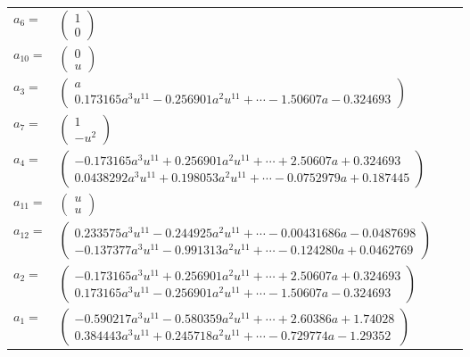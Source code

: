 \documentclass[1p]{elsarticle_modified}
\theoremstyle{definition}
\begin{document}
\begin{tabular}{m{7pt} m{180pt} m{7pt} m{180pt} }
\flushright $a_{6}=$&$\begin{pmatrix}1\\0\end{pmatrix}$ \\
\flushright $a_{10}=$&$\begin{pmatrix}0\\u\end{pmatrix}$ \\
\flushright $a_{3}=$&$\begin{pmatrix}a\\0.173165 a^{3} u^{11}-0.256901 a^{2} u^{11}+\cdots-1.50607 a-0.324693\end{pmatrix}$ \\
\flushright $a_{7}=$&$\begin{pmatrix}1\\- u^2\end{pmatrix}$ \\
\flushright $a_{4}=$&$\begin{pmatrix}-0.173165 a^{3} u^{11}+0.256901 a^{2} u^{11}+\cdots+2.50607 a+0.324693\\0.0438292 a^{3} u^{11}+0.198053 a^{2} u^{11}+\cdots-0.0752979 a+0.187445\end{pmatrix}$ \\
\flushright $a_{11}=$&$\begin{pmatrix}u\\u\end{pmatrix}$ \\
\flushright $a_{12}=$&$\begin{pmatrix}0.233575 a^{3} u^{11}-0.244925 a^{2} u^{11}+\cdots-0.00431686 a-0.0487698\\-0.137377 a^{3} u^{11}-0.991313 a^{2} u^{11}+\cdots-0.124280 a+0.0462769\end{pmatrix}$ \\
\flushright $a_{2}=$&$\begin{pmatrix}-0.173165 a^{3} u^{11}+0.256901 a^{2} u^{11}+\cdots+2.50607 a+0.324693\\0.173165 a^{3} u^{11}-0.256901 a^{2} u^{11}+\cdots-1.50607 a-0.324693\end{pmatrix}$ \\
\flushright $a_{1}=$&$\begin{pmatrix}-0.590217 a^{3} u^{11}-0.580359 a^{2} u^{11}+\cdots+2.60386 a+1.74028\\0.384443 a^{3} u^{11}+0.245718 a^{2} u^{11}+\cdots-0.729774 a-1.29352\end{pmatrix}$ \\

\end{tabular}
\end{document}
